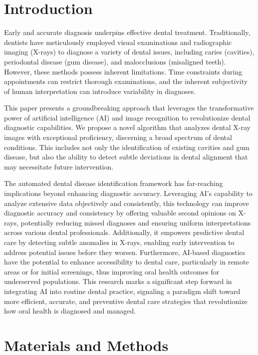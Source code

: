 \documentclass[journal,twoside,web]{ieeecolor}
\begin{document}
\section{Introduction}
\label{sec:introduction}
Early and accurate diagnosis underpins effective dental treatment.
Traditionally, dentists have meticulously employed visual examinations and
radiographic imaging (X-rays) to diagnose a variety of dental issues,
including caries (cavities), periodontal disease (gum disease),
and malocclusions (misaligned teeth).
However, these methods possess inherent limitations.
Time constraints during
appointments can restrict thorough examinations, and the inherent subjectivity of human
interpretation can introduce variability in diagnoses.

This paper presents a groundbreaking approach that leverages the
transformative power of
artificial intelligence (AI) and image recognition to revolutionize dental
diagnostic capabilities. We propose a novel algorithm that
analyzes dental X-ray images with exceptional proficiency, discerning a broad
spectrum of dental conditions. This includes not
only the identification of existing
cavities and gum disease, but also the ability to detect subtle
deviations in dental alignment that may necessitate future intervention.

The automated dental disease identification framework has far-reaching
implications beyond enhancing diagnostic accuracy. Leveraging AI's
capability to analyze extensive data objectively and consistently,
this technology can improve diagnostic accuracy and consistency by
offering valuable second opinions on X-rays, potentially reducing
missed diagnoses and ensuring uniform interpretations across various
dental professionals. Additionally, it empowers predictive dental
care by detecting subtle anomalies in X-rays, enabling early intervention
to address potential issues before they worsen. Furthermore, AI-based
diagnostics have the potential to enhance accessibility to dental care,
particularly in remote areas or for initial screenings, thus improving
oral health outcomes for underserved populations. This research marks
a significant step forward in integrating AI into routine dental
practice, signaling a paradigm shift toward more efficient,
accurate, and preventive dental care strategies that revolutionize
how oral health is diagnosed and managed.



\section{Materials and Methods}
\end{document}

